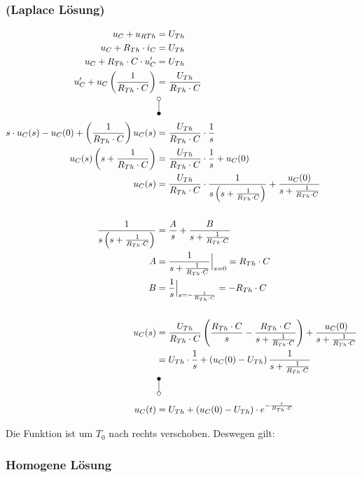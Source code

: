\documentclass[11pt]{scrartcl}
\newcommand{\vlaplace}[1][]{\mbox{\setlength{\unitlength}{0.1em}%
    \begin{picture}(10,20)%
      \put(3,2){\circle{4}}%
      \put(3,4){\line(0,1){12}}%
      \put(3,18){\circle*{4}}%
      \put(10,7){#1}
    \end{picture}%
  }%
}%
\newcommand{\vLaplace}[1][]{\mbox{\setlength{\unitlength}{0.1em}%
    \begin{picture}(10,20)%
      \put(3,2){\circle*{4}}%
      \put(3,4){\line(0,1){12}}%
      \put(3,18){\circle{4}}%
      \put(10,7){#1}
    \end{picture}%
  }%
}%
\begin{document}
\subsubsection{(Laplace Lösung)}
\setlength{\jot}{12pt}
\begin{align*}
  u_C + u_{RTh} &= U_{Th} \\
  u_C + R_{Th} \cdot i_C &= U_{Th} \\
  u_C + R_{Th} \cdot C \cdot u_C^{\prime} &= U_{Th} \\
  u_C^{\prime} + u_C \left( \frac{1}{R_{Th} \cdot C}\right) &= \frac{U_{Th}}{R_{Th} \cdot C} \\
                &\vLaplace \\
  s \cdot u_C(s) - u_C (0) + \left( \frac{1}{R_{Th} \cdot C} \right) u_C(s) &= \frac{U_{Th}}{R_{Th} \cdot C} \cdot \frac{1}{s} \\
  u_C(s) \left(s + \frac{1}{R_{Th} \cdot C}\right) &= \frac{U_{Th}}{R_{Th} \cdot C} \cdot \frac{1}{s} + u_C(0) \\
  u_C(s) &= \frac{U_{Th}}{R_{Th} \cdot C} \cdot\frac{1}{s \left( s + \frac{1}{R_{Th} \cdot C} \right)} + \frac{u_C(0)}{s + \frac{1}{R_{Th} \cdot C}} \\ \\
  \frac{1}{s\left(s + \frac{1}{R_{Th} \cdot C} \right)} &= \frac{A}{s} + \frac{B}{s + \frac{1}{R_{Th}\cdot C}} \\
  A &= \frac{1}{s + \frac{1}{R_{Th} \cdot C}} \Big|_{s=0} = R_{Th} \cdot C \\
  B &= \frac{1}{s} \Big|_{s=-\frac{1}{R_{Th} \cdot C}} = - R_{Th} \cdot C \\ \\
  u_C(s) &= \frac{U_{Th}}{R_{Th} \cdot C} \left( \frac{R_{Th} \cdot C}{s} - \frac{R_{Th} \cdot C}{s + \frac{1}{R_{Th} \cdot C}}\right) + \frac{u_C(0)}{s + \frac{1}{R_{Th} \cdot C}} \\
                &= U_{Th} \cdot \frac{1}{s} + \left( u_C(0) - U_{Th} \right) \frac{1}{s + \frac{1}{R_{Th} \cdot C}} \\
                &\vlaplace \\
  u_C(t) &= U_{Th} + (u_C(0) - U_{Th}) \cdot e^{-\frac{t}{R_{Th} \cdot C}} \\
\end{align*}

Die Funktion ist um $T_0$ nach rechts verschoben. Deswegen gilt:
\subsubsection{Homogene Lösung}
\end{document}
